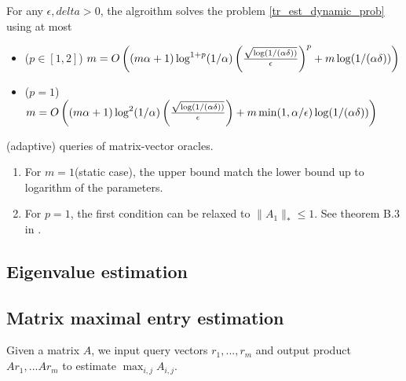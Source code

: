 

\begin{thm}
\label{tr_est_alg_schatten_p}
For any $\epsilon,delta>0$, the algroithm  solves the problem \ref{tr_est_dynamic_prob} using at most
\begin{itemize}
    \item ($p\in[1,2]$) $m=O\left((m\alpha +1)\log^{1+p}(1/\alpha)\left(\frac{\sqrt{\log(1/(\alpha\delta))}}{\epsilon}\right)^p+m\log(1/(\alpha\delta))\right)$
    \item ($p=1$) $m=O\left((m\alpha +1)\log^{2}(1/\alpha)\left(\frac{\sqrt{\log(1/(\alpha\delta))}}{\epsilon}\right)+m\min(1,\alpha/\epsilon)\log(1/(\alpha\delta))\right)$
\end{itemize}
(adaptive) queries of matrix-vector oracles.
\end{thm}
\pfsk{\ref{tr_est_alg_schatten_p}}{
}
\begin{rmk}
\begin{enumerate}
    \item For $m=1$(static case), the upper bound match the lower bound up to logarithm of the parameters.
    \item For $p=1$, the first condition can be relaxed to $\|A_1\|_*\le 1$. See theorem B.3 in \cite{woodruff2022optimal}.
\end{enumerate}
\end{rmk}

\subsection{Eigenvalue estimation}
\cite{braverman2021gradient}


\subsection{Matrix maximal entry estimation}
\begin{prob}
\label{mt_max_est}
Given a matrix $A$, we input query vectors $r_1,...,r_m$ and output product $Ar_1,...Ar_m$ to estimate $\max_{i,j}A_{i,j}$. 
\end{prob}

